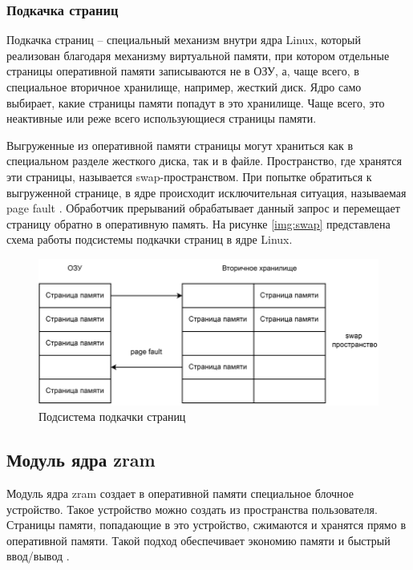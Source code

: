 \subsubsection{Подкачка страниц}

Подкачка страниц -- специальный механизм внутри ядра Linux, который реализован благодаря механизму виртуальной памяти, при котором отдельные страницы оперативной памяти записываются не в ОЗУ, а, чаще всего, в специальное вторичное хранилище, например, жесткий диск. Ядро само выбирает, какие страницы памяти попадут в это хранилище. Чаще всего, это неактивные или реже всего использующиеся страницы памяти. 

Выгруженные из оперативной памяти страницы могут храниться как в специальном разделе жесткого диска, так и в файле. Пространство, где хранятся эти страницы, называется swap-пространством. При попытке обратиться к выгруженной странице, в ядре происходит исключительная ситуация, называемая page fault \cite{page-fault}. Обработчик прерываний обрабатывает данный запрос и перемещает страницу обратно в оперативную память. На рисунке \ref{img:swap} представлена схема работы подсистемы подкачки страниц в ядре Linux.

\begin{figure}[h]
	\centering
	\includegraphics[width=\textwidth]{img/swap.pdf}
	\caption{Подсистема подкачки страниц}
	\label{fig:swap}
\end{figure}

\subsection{Модуль ядра zram}

Модуль ядра zram создает в оперативной памяти специальное блочное устройство. Такое устройство можно создать из пространства пользователя. Страницы памяти, попадающие в это устройство, сжимаются и хранятся прямо в оперативной памяти. Такой подход обеспечивает экономию памяти и быстрый ввод/вывод \cite{zram}. 

